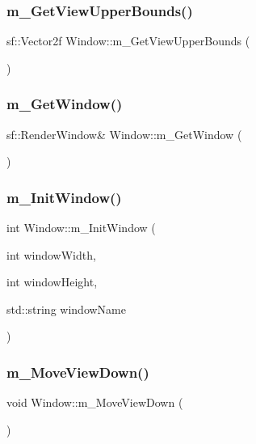 \subsubsection{\texorpdfstring{m\+\_\+\+Get\+View\+Upper\+Bounds()}{m\_GetViewUpperBounds()}}
{\footnotesize\ttfamily sf\+::\+Vector2f Window\+::m\+\_\+\+Get\+View\+Upper\+Bounds (\begin{DoxyParamCaption}{ }\end{DoxyParamCaption})}

\mbox{\label{class_window_a1962bb9a9c39e16b470e550fd0be279b}} 
\subsubsection{\texorpdfstring{m\+\_\+\+Get\+Window()}{m\_GetWindow()}}
{\footnotesize\ttfamily sf\+::\+Render\+Window\& Window\+::m\+\_\+\+Get\+Window (\begin{DoxyParamCaption}{ }\end{DoxyParamCaption})}

\mbox{\label{class_window_aa5fa7e2990fc960995c132630083844e}} 
\subsubsection{\texorpdfstring{m\+\_\+\+Init\+Window()}{m\_InitWindow()}}
{\footnotesize\ttfamily int Window\+::m\+\_\+\+Init\+Window (\begin{DoxyParamCaption}\item[{int}]{window\+Width,  }\item[{int}]{window\+Height,  }\item[{std\+::string}]{window\+Name }\end{DoxyParamCaption})}

\mbox{\label{class_window_a3de665891c06fec35dbfb719a4db7ab7}} 
\subsubsection{\texorpdfstring{m\+\_\+\+Move\+View\+Down()}{m\_MoveViewDown()}}
{\footnotesize\ttfamily void Window\+::m\+\_\+\+Move\+View\+Down (\begin{DoxyParamCaption}{ }\end{DoxyParamCaption})}

